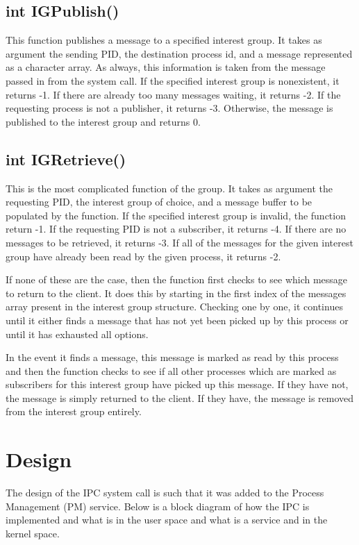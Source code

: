 \documentclass{article}
\begin{document}
\subsection{int IGPublish()}
This function publishes a message to a specified interest group.  It takes as argument the sending PID, the destination process id, and a message represented as a character array.  As always, this information is taken from the message passed in from the system call.  If the specified interest group is nonexistent, it returns -1.  If there are already too many messages waiting, it returns -2.  If the requesting process is not a publisher, it returns -3.  Otherwise, the message is published to the interest group and returns 0.

\subsection{int IGRetrieve()}
This is the most complicated function of the group.  It takes as argument the requesting PID, the interest group of choice, and a message buffer to be populated by the function.  If the specified interest group is invalid, the function return -1.  If the requesting PID is not a subscriber, it returns -4.  If there are no messages to be retrieved, it returns -3.  If all of the messages for the given interest group have already been read by the given process, it returns -2.

If none of these are the case, then the function first checks to see which message to return to the client.  It does this by starting in the first index of the messages array present in the interest group structure.  Checking one by one, it continues until it either finds a message that has not yet been picked up by this process or until it has exhausted all options.

In the event it finds a message, this message is marked as read by this process and then the function checks to see if all other processes which are marked as subscribers for this interest group have picked up this message.  If they have not, the message is simply returned to the client.  If they have, the message is removed from the interest group entirely.


\section{Design}
The design of the IPC system call is such that it was added to the Process Management (PM) service. Below is a block diagram of how the IPC is implemented and what is in the user space and what is a service and in the kernel space. 
\end{document}
